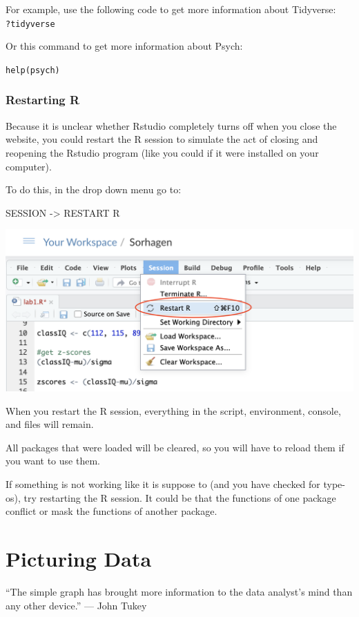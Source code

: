 \documentclass[
]{book}
\begin{document}
For example, use the following code to get more information about Tidyverse:\\
\texttt{?tidyverse}

Or this command to get more information about Psych:

\texttt{help(psych)}

\hypertarget{restarting-r}{%
\subsection{Restarting R}\label{restarting-r}}

Because it is unclear whether Rstudio completely turns off when you close the website, you could restart the R session to simulate the act of closing and reopening the Rstudio program (like you could if it were installed on your computer).

To do this, in the drop down menu go to:

SESSION -\textgreater{} RESTART R

\includegraphics{img/restart.png}

When you restart the R session, everything in the script, environment, console, and files will remain.

All packages that were loaded will be cleared, so you will have to reload them if you want to use them.

If something is not working like it is suppose to (and you have checked for type-os), try restarting the R session. It could be that the functions of one package conflict or mask the functions of another package.

\hypertarget{picturing-data}{%
\chapter{Picturing Data}\label{picturing-data}}

``The simple graph has brought more information to the data analyst's mind than any other device.'' --- John Tukey
\end{document}
